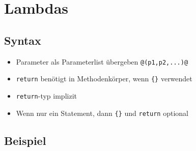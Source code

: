 \section{Lambdas}

\subsection{Syntax}

\begin{itemize}
    \item Parameter als Parameterlist übergeben \lstinline{@(p1,p2,...)@}
    \item \lstinline{return} benötigt in Methodenkörper, wenn \lstinline|{}| verwendet
    \item \lstinline{return}-typ implizit
    \item Wenn nur ein Statement, dann \lstinline|{}| und \lstinline{return} optional
\end{itemize}
\subsection{Beispiel}

